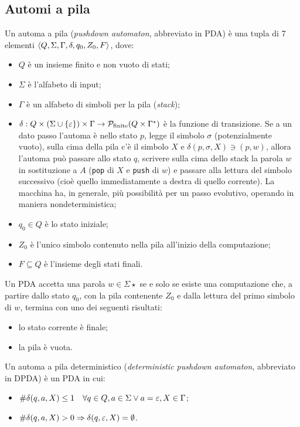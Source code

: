 \subsection{Automi a pila}
\begin{defin}
	Un automa a pila (\emph{pushdown automaton}, abbreviato in PDA) è una tupla di 7 elementi $\langle Q,\Sigma,\Gamma,\delta,q_0,Z_0,F \rangle$, dove:
	\begin{itemize}
		\item $Q$ è un insieme finito e non vuoto di stati;
		\item $\Sigma$ è l'alfabeto di input;
		\item $\Gamma$ è un alfabeto di simboli per la pila (\emph{stack});
		\item $\delta:Q\times(\Sigma\cup\left\{ \varepsilon \right\})\times\Gamma\to \mathcal P_{\text{finite}}(Q\times\Gamma^*)$ è la funzione di transizione. Se a un dato passo l'automa è nello stato $p$, legge il simbolo $\sigma$ (potenzialmente vuoto), sulla cima della pila c'è il simbolo $X$ e $\delta(p,\sigma,X)\ni (p,w)$, allora l'automa può passare allo stato $q$, scrivere sulla cima dello stack la parola $w$ in sostituzione a $A$ (\verb!pop! di $X$ e \verb!push! di $w$) e passare alla lettura del simbolo successivo (cioè quello immediatamente a destra di quello corrente). La macchina ha, in generale, più possibilità per un passo evolutivo, operando in maniera nondeterministica;
		\item $q_0\in Q$ è lo stato iniziale;
		\item $Z_0$ è l'unico simbolo contenuto nella pila all'inizio della computazione;
		\item $F\subseteq Q$ è l'insieme degli stati finali.
	\end{itemize}
	Un PDA accetta una parola $w\in\Sigma\star$ se e solo se esiste una computazione che, a partire dallo stato $q_0$, con la pila contenente $Z_0$ e dalla lettura del primo simbolo di $w$, termina con uno dei seguenti risultati:
	\begin{itemize}
		\item lo stato corrente è finale;
		\item la pila è vuota.
	\end{itemize}
\end{defin}
\begin{defin}
	Un automa a pila deterministico (\emph{deterministic pushdown automaton}, abbreviato in DPDA) è un PDA in cui:
	\begin{itemize}
		\item $\# \delta(q,a,X)\leq 1\quad \forall q\in Q, a\in\Sigma\lor a=\varepsilon, X\in\Gamma$;
		\item $\# \delta(q,a,X)>0\Rightarrow \delta(q,\varepsilon,X)=\emptyset$.
	\end{itemize}
\end{defin}

